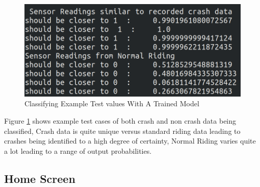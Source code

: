 \vspace{3cm}




\begin{figure}[h]
      \centering
      \includegraphics[scale = .5]{implementation/tv.png}
      \caption{Classifying Example Test values With A Trained Model}
      \label{tv}
\end{figure}



Figure \ref{tv} shows example test cases of both crash and non crash data being classified, Crash data is quite unique versus standard riding data leading to crashes being identified to a high degree of certainty, Normal Riding varies quite a lot leading to a range of output probabilities. 



\newpage
\subsection{Home Screen}


